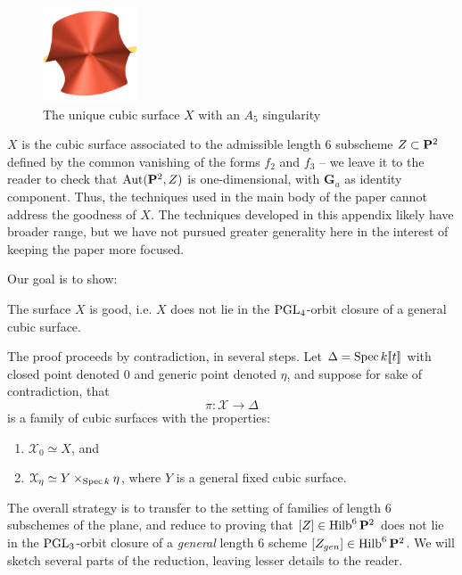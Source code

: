 \documentclass[12pt,reqno]{amsart}
\renewcommand{\k}{k}
\DeclareMathOperator{\Hilb}{Hilb}
\renewcommand{\to}{{\longrightarrow}}
\numberwithin{equation}{section}
\newcommand{\G}{\mathbf G}
\begin{document}
\begin{figure}
  \centering
  \includegraphics[width=0.25\textwidth]{cubicA5}
  \caption{The unique cubic surface $X$ with an $A_5$ singularity}
  \label{figure:cubicA5}
\end{figure}

$X$ is the cubic surface associated to the admissible length $6$
subscheme $Z \subset \P^{2}$ defined by the common vanishing of the
forms $f_{2}$ and $f_{3}$ -- we leave it to the reader to check that
$\Aut(\P^{2},Z)$ is one-dimensional, with $\G_{a}$ as identity
component.  Thus, the techniques used in the main body of the paper
cannot address the goodness of $X$.  The techniques developed in this
appendix likely have broader range, but we have not pursued greater
generality here in the interest of keeping the paper more focused.


Our goal is to show:

\begin{theorem}
  \label{theorem:A5good} The surface $X$ is good, i.e. $X$ does not
  lie in the $\PGL_4$-orbit closure of a general cubic surface.
\end{theorem}

The proof proceeds by contradiction, in several steps. Let
$\Delta = \spec \k [\![t]\!]$ with closed point denoted $0$ and generic
point denoted $\eta$, and suppose for sake of contradiction, that
\[\pi: \mathcal{X} \to \Delta\]
is a family of cubic surfaces with the properties:
\begin{enumerate}
\item $\mathcal{X}_{0} \simeq X$, and\\
\item $\mathcal{X}_{\eta} \simeq Y \times_{\spec \k} \eta$, where $Y$ is a
  general fixed cubic surface.
\end{enumerate}

The overall strategy is to transfer to the setting of families of
length $6$ subschemes of the plane, and reduce to proving that
$[Z] \in \Hilb^{6}\P^{2}$ does not lie in the $\PGL_3$-orbit closure
of a {\sl general} length $6$ scheme $[Z_{gen}] \in \Hilb^{6}\P^{2}$.
We will sketch several parts of the reduction, leaving lesser details
to the reader.
\end{document}
